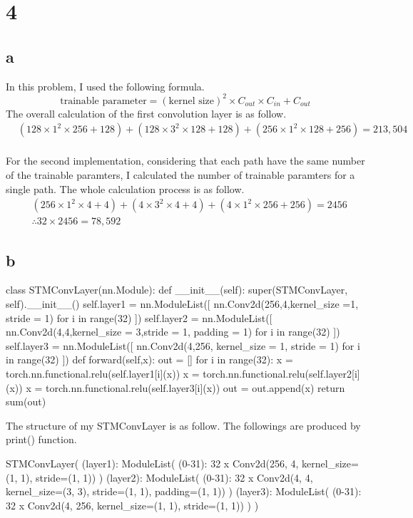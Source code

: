 \documentclass[10pt]{article}
\begin{document}
\section*{4}
\subsection*{a}
In this problem, I used the following formula.
\begin{equation*}
    \text{trainable parameter} = (\text{kernel size})^2 \times C_{out} \times C_{in} + C_{out}
\end{equation*}
The overall calculation of the first convolution layer is as follow.
\begin{align*}
    &(128\times 1^2 \times 256 + 128) + (128 \times 3^2 \times 128 + 128) + (256\times 1^2 \times 128 + 256) = 213,504 \\
\end{align*}

For the second implementation, considering that each path have the same number of the trainable paramters, I calculated the number of trainable paramters for a single path. 
The whole calculation process is as follow.
\begin{align*}
    &(256\times 1^2 \times 4 + 4) + (4 \times 3^2 \times 4 + 4) + (4\times 1^2 \times 256 + 256) = 2456 \\
    &\therefore 32\times 2456 = 78,592
\end{align*}
\subsection*{b}
\begin{python}
class STMConvLayer(nn.Module):
    def __init__(self):
        super(STMConvLayer, self).__init__()
        self.layer1 = nn.ModuleList([
            nn.Conv2d(256,4,kernel_size =1, stride = 1)
            for i in range(32)
        ])
        self.layer2 = nn.ModuleList([
            nn.Conv2d(4,4,kernel_size = 3,stride = 1, padding = 1)
            for i in range(32)
        ])
        self.layer3 = nn.ModuleList([
            nn.Conv2d(4,256, kernel_size = 1, stride = 1)
            for i in range(32)
        ])
    def forward(self,x):
        out = []
        for i in range(32):
            x = torch.nn.functional.relu(self.layer1[i](x))
            x = torch.nn.functional.relu(self.layer2[i](x))
            x = torch.nn.functional.relu(self.layer3[i](x))
            out = out.append(x)
        return sum(out)
\end{python}
The structure of my STMConvLayer is as follow. The followings are produced by print() function.
\begin{python}
STMConvLayer(
  (layer1): ModuleList(
    (0-31): 32 x Conv2d(256, 4, kernel_size=(1, 1), stride=(1, 1))
  )
  (layer2): ModuleList(
    (0-31): 32 x Conv2d(4, 4, kernel_size=(3, 3), stride=(1, 1), padding=(1, 1))
  )
  (layer3): ModuleList(
    (0-31): 32 x Conv2d(4, 256, kernel_size=(1, 1), stride=(1, 1))
  )
)
\end{python}
\end{document}
